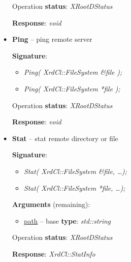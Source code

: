 \documentclass{article}
\begin{document}
\begin{itemize}
\begin{samepage}
                    Operation \textbf{status}: \textit{XRootDStatus}

                    \textbf{Response}: \textit{void}
                    
                \end{samepage}
                    
                \item \begin{samepage} \textbf{Ping} -- ping remote server

                    \textbf{Signature}:
                    \begin{itemize}
                        \item \textit{Ping( XrdCl::FileSystem \&file );}
                        \item \textit{Ping( XrdCl::FileSystem *file );}
                    \end{itemize}

                    Operation \textbf{status}: \textit{XRootDStatus}

                    \textbf{Response}: \textit{void}
                    
                \end{samepage}
                    
                \item \begin{samepage} \textbf{Stat} -- stat remote directory or file

                    \textbf{Signature}:
                    \begin{itemize}
                        \item \textit{Stat( XrdCl::FileSystem \&file, \ldots);}
                        \item \textit{Stat( XrdCl::FileSystem *file, \ldots );}
                    \end{itemize}

                    \textbf{Arguments} (remaining):
                    \begin{itemize}
                        \item \underline{path} -- base \textbf{type}: \textit{std::string}
                    \end{itemize}

                    Operation \textbf{status}: \textit{XRootDStatus}

                    \textbf{Response}: \textit{XrdCl::StatInfo}
                    

\end{samepage}
\end{itemize}
\end{document}
